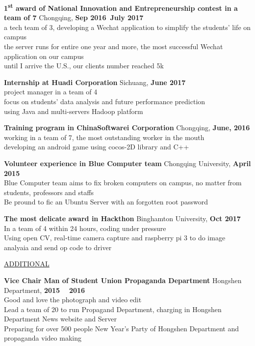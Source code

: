 \documentclass{article}
\begin{document}
\noindent
\textbf{1\textsuperscript{st} award of National Innovation and Entrepreneurship contest in a team of 7}
\hfill Chongqing, \textbf{Sep 2016~July 2017} \\
    \indent a tech team of 3, developing a Wechat application to simplify the students' life on campus \\
    \indent the server runs for entire one year and more, the most successful Wechat application on our campus \\
    \indent until I arrive the U.S., our clients number reached 5k
\begin{comment}
\end{comment}

\noindent
\textbf{Internship at Huadi Corporation}
\hfill Sichuang, \textbf{June 2017} \\
    \indent project manager in a team of 4 \\
    \indent focus on students' data analysis and future performance prediction \\
    \indent using Java and multi-servers Hadoop platform

\noindent
\textbf{Training program in ChinaSoftwarei Corporation}
\hfill Chongqing, \textbf{June, 2016} \\
    \indent working in a team of 7, the most outstanding worker in the mouth \\
    \indent developing an android game using cocos-2D library and C++

\noindent
\textbf{Volunteer experience in Blue Computer team}
\hfill Chongqing University, \textbf{April 2015} \\
    \indent Blue Computer team aims to fix broken computers on campus, no matter from students, professors and staffs \\
    \indent Be pround to fic an Ubuntu Server with an forgotten root password

\noindent
\textbf{The most delicate award in Hackthon}
\hfill Binghamton University, \textbf{Oct 2017} \\
    \indent In a team of 4 within 24 hours, coding under pressure \\
    \indent Using open CV, real-time camera capture and raspberry pi 3 to do image analyaia and send op code to driver

\begin{comment}
\noindent
\textbf{Research Assistant in G-lib}

\noindent
\textbf{Research Assistant in P-lib}
\end{comment}

\noindent
\uline{ADDITIONAL}

\noindent
\textbf{Vice Chair Man of Student Union Propaganda Department}
\hfill Hongshen Department, \textbf{2015 ~ 2016} \\
    \indent Good and love the photograph and video edit \\
    \indent Lead a team of 20 to run Propagand Department, charging in Hongshen Department News website and Server \\
    \indent Preparing for over 500 people New Year's Party of Hongshen Department and propaganda video making
\end{document}
